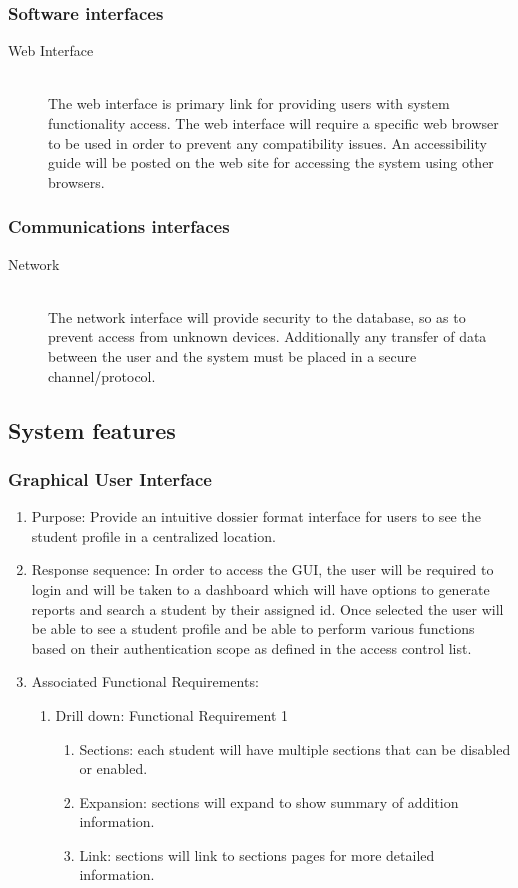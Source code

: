 \documentclass{journal}
\begin{document}
		\subsubsection{Software interfaces}
		\begin{description}
		\item[Web Interface]\hfill \\
			The web interface is primary link for providing users with system functionality access. The web interface will require a specific web browser to be used in order to prevent any compatibility issues. An accessibility guide will be posted on the web site for accessing the system using other browsers. 
			\end{description}

			\subsubsection{Communications interfaces}
			\begin{description}
			\item[Network]\hfill \\
				The network interface will provide security to the database, so as to prevent access from unknown devices. Additionally any transfer of data between the user and the system must be placed in a secure channel/protocol.  
				\end{description}


				\subsection{System features}
				\subsubsection{Graphical User Interface}
				\begin{enumerate}
				\item Purpose: Provide an intuitive dossier format interface for users to see the student profile in a centralized location.
				\item Response sequence: In order to access the GUI, the user will be required to login and will be taken to a dashboard which will have options to generate reports and search a student by their assigned id. Once selected the user will be able to see a student profile and be able to perform various functions based on their authentication scope as defined in the access control list.
				\item Associated Functional Requirements:
				\begin{enumerate}
				\item Drill down: Functional Requirement 1
				\begin{enumerate}
				\item Sections: each student will have multiple sections that can be disabled or enabled.
				\item Expansion: sections will expand to show summary of addition information.
				\item Link: sections will link to sections pages for more detailed information.
				\end{enumerate}
				\end{enumerate}
				\end{enumerate}
\end{document}
